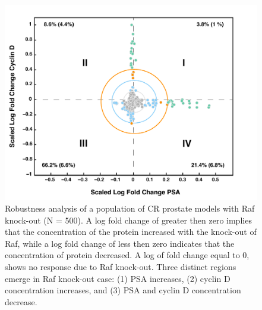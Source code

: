 \documentclass[12pt]{article}
\begin{document}
\begin{figure}\centering
\includegraphics[width=1.0\textwidth]{./figs/Figure6_RAF_K0_C81.pdf}
\caption{Robustness analysis of a population of CR prostate models with Raf knock-out (N = 500). A log fold change of greater then zero implies that the concentration of the protein increased with the knock-out of Raf, while a log fold change of less then zero indicates that the concentration of protein decreased. A log of fold change equal to 0, shows no response due to Raf knock-out. Three distinct regions emerge in Raf knock-out case: (1) PSA increases, (2) cyclin D concentration increases, and (3) PSA and cyclin D concentration decrease. }
\label{fg:Robustness}
\end{figure}

\clearpage
\end{document}
